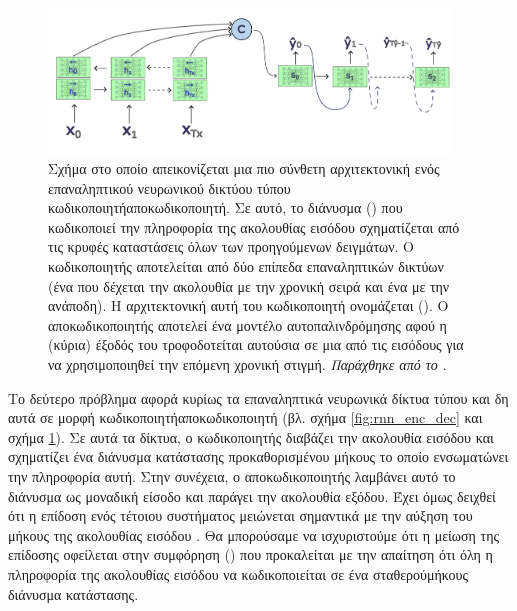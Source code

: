 \begin{figure}[h]
  \centering
  \includegraphics[width=0.95\textwidth]{images/chapter theoritical background/rnn_encoder_decoder_complex.pdf}
  \caption{Σχήμα στο οποίο απεικονίζεται μια πιο σύνθετη αρχιτεκτονική ενός επαναληπτικού νευρωνικού δικτύου τύπου κωδικοποιητή\textendash αποκωδικοποιητή. Σε αυτό, το διάνυσμα () που κωδικοποιεί την πληροφορία της ακολουθίας εισόδου σχηματίζεται από τις κρυφές καταστάσεις όλων των προηγούμενων δειγμάτων. Ο κωδικοποιητής αποτελείται από δύο επίπεδα επαναληπτικών δικτύων (ένα που δέχεται την ακολουθία με την χρονική σειρά και ένα με την ανάποδη). Η αρχιτεκτονική αυτή του κωδικοποιητή ονομάζεται  (). Ο αποκωδικοποιητής αποτελεί ένα μοντέλο αυτοπαλινδρόμησης αφού η (κύρια) έξοδός του τροφοδοτείται αυτούσια σε μια από τις εισόδους για να χρησιμοποιηθεί την επόμενη χρονική στιγμή. \textit{Παράχθηκε από το \href{https://inkscape.org/}{}}.}
  \label{fig:rnn_encoder_decoder_no_attention}
\end{figure}

Το δεύτερο πρόβλημα αφορά κυρίως τα επαναληπτικά νευρωνικά δίκτυα τύπου  και δη αυτά σε μορφή κωδικοποιητή\textendash αποκωδικοποιητή (βλ. σχήμα \ref{fig:rnn_enc_dec} και σχήμα \ref{fig:rnn_encoder_decoder_no_attention}). Σε αυτά τα δίκτυα, ο κωδικοποιητής διαβάζει την ακολουθία εισόδου και σχηματίζει ένα διάνυσμα κατάστασης προκαθορισμένου μήκους το οποίο ενσωματώνει την πληροφορία αυτή. Στην συνέχεια, ο αποκωδικοποιητής λαμβάνει αυτό το διάνυσμα ως μοναδική είσοδο και παράγει την ακολουθία εξόδου. Έχει όμως δειχθεί ότι η επίδοση ενός τέτοιου συστήματος μειώνεται σημαντικά με την αύξηση του μήκους της ακολουθίας εισόδου \cite{cho2014properties}. Θα μπορούσαμε να ισχυριστούμε ότι η μείωση της επίδοσης οφείλεται στην συμφόρηση () που προκαλείται με την απαίτηση ότι όλη η πληροφορία της ακολουθίας εισόδου να κωδικοποιείται σε ένα σταθερού\textendash μήκους διάνυσμα κατάστασης\cite{bahdanau2014neural_machine_translation_attention_begins}.\par

